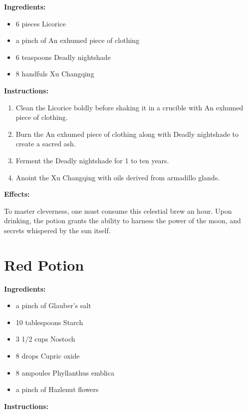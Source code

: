 \documentclass{article}
\begin{document}
\textbf{Ingredients:}

\begin{itemize}
  \item 6 pieces Licorice
  \item a pinch of An exhumed piece of clothing
  \item 6 teaspoons Deadly nightshade
  \item 8 handfuls Xu Changqing
\end{itemize}

\textbf{Instructions:}

\begin{enumerate}
  \item Clean the Licorice boldly before shaking it in a crucible with An exhumed piece of clothing.
  \item Burn the An exhumed piece of clothing along with Deadly nightshade to create a sacred ash.
  \item Ferment the Deadly nightshade for 1 to ten years.
  \item Anoint the Xu Changqing with oils derived from armadillo glands.
\end{enumerate}

\textbf{Effects:}

To master cleverness, one must consume this celestial brew an hour. Upon drinking, the potion grants the ability to harness the power of the moon, and secrets whispered by the sun itself.

\newpage
\section*{Red Potion}

\textbf{Ingredients:}

\begin{itemize}
  \item a pinch of Glauber's salt
  \item 10 tablespoons Starch
  \item 3 1/2 cups Nostoch
  \item 8 drops Cupric oxide
  \item 8 ampoules Phyllanthus emblica
  \item a pinch of Hazlenut flowers
\end{itemize}

\textbf{Instructions:}
\end{document}
